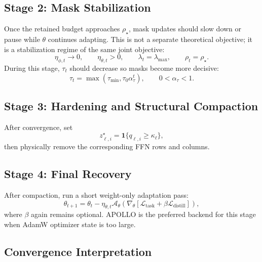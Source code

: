 \documentclass[11pt]{article}
\newcommand{\Loss}{\mathcal{L}}
\begin{document}
\subsection{Stage 2: Mask Stabilization}

Once the retained budget approaches $\rho_{\star}$, mask updates should slow down or pause while $\theta$ continues adapting. This is not a separate theoretical objective; it is a stabilization regime of the same joint objective:
\begin{equation}
  \eta_{\phi,t}\rightarrow 0,
  \qquad
  \eta_{\theta,t}>0,
  \qquad
  \lambda_t=\lambda_{\max},
  \qquad
  \rho_t=\rho_{\star}.
\end{equation}
During this stage, $\tau_t$ should decrease so masks become more decisive:
\begin{equation}
  \tau_t
  =
  \max(\tau_{\min}, \tau_0 \alpha_{\tau}^{t}),
  \qquad
  0<\alpha_{\tau}<1.
\end{equation}

\subsection{Stage 3: Hardening and Structural Compaction}

After convergence, set
\begin{equation}
  z_{\ell,i}^{\star}
  =
  \mathbf{1}\{q_{\ell,i} \geq \kappa_{\ell}\},
\end{equation}
then physically remove the corresponding FFN rows and columns.

\subsection{Stage 4: Final Recovery}

After compaction, run a short weight-only adaptation pass:
\begin{equation}
  \theta_{t+1}
  =
  \theta_t
  -
  \eta_{\theta,t}
  \mathcal{A}_{\theta}
  \left(
    \nabla_{\theta}
    \left[
      \Loss_{\mathrm{task}}
      +
      \beta\Loss_{\mathrm{distill}}
    \right]
  \right),
\end{equation}
where $\beta$ again remains optional. APOLLO is the preferred backend for this stage when AdamW optimizer state is too large.

\subsection{Convergence Interpretation}
\end{document}
